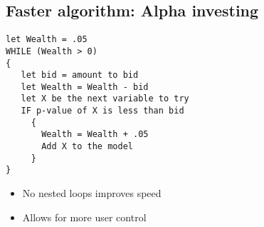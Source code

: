 \documentclass[12pt]{extarticle} %
\begin{document}
\newpage
\subsection{Faster algorithm: Alpha investing}

\begin{verbatim}
let Wealth = .05
WHILE (Wealth > 0)
{
   let bid = amount to bid
   let Wealth = Wealth - bid
   let X be the next variable to try
   IF p-value of X is less than bid
     {
       Wealth = Wealth + .05
       Add X to the model
     }
}
\end{verbatim}
\begin{itemize}
\item No nested loops improves speed 
\item Allows for more user control
\end{itemize}
\end{document}
